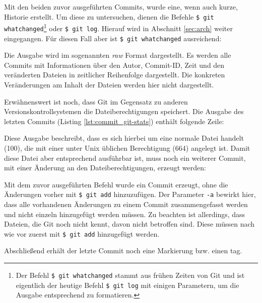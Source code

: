 
Mit den beiden zuvor ausgeführten Commits, wurde eine, wenn auch
kurze, Historie erstellt. Um diese zu untersuchen, dienen die Befehle
\texttt{\$ git whatchanged}\footnote{Der Befehl \texttt{\$ git whatchanged}
stammt aus frühen Zeiten von Git und ist eigentlich der heutige Befehl
\texttt{\$ git log} mit einigen Parametern, um die Ausgabe entsprechend zu
formatieren.} oder \texttt{\$ git log}. Hierauf wird in Abschnitt \ref{sec:arch}
weiter eingegangen. Für diesen Fall aber ist \texttt{\$ git whatchanged}
ausreichend:


Die Ausgabe wird im sogenannten \textit{raw} Format dargestellt. Es werden alle
Commits mit Informationen über den Autor, Commit-ID, Zeit und den veränderten
Dateien in zeitlicher Reihenfolge dargestellt. Die konkreten Veränderungen am
Inhalt der Dateien werden hier nicht dargestellt.

Erwähnenswert ist noch, dass Git im Gegensatz zu anderen
Versionskontrollsystemen die Dateiberechtigungen speichert. Die Ausgabe des
letzten Commits (Listing \ref{lst:commit_git-stats}) enthält folgende Zeile:


Diese Ausgabe beschreibt, dass es sich hierbei um eine normale Datei handelt (100),
die mit einer unter Unix üblichen Berechtigung (664) angelegt ist. Damit
diese Datei aber entsprechend ausführbar ist, muss noch ein weiterer
Commit, mit einer Änderung an den Dateiberechtigungen, erzeugt werden:


Mit dem zuvor ausgeführten Befehl wurde ein Commit erzeugt, ohne die
Änderungen vorher mit \texttt{\$ git add} hinzuzufügen. Der Parameter
\texttt{-a} bewirkt hier, dass alle vorhandenen Änderungen zu einem Commit
zusammengefasst werden und nicht einzeln hinzugefügt werden müssen. Zu beachten
ist allerdings, dass Dateien, die Git noch nicht kennt, davon nicht betroffen
sind. Diese müssen nach wie vor zuerst mit \texttt{\$ git add} hinzugefügt
werden.

Abschließend erhält der letzte Commit noch eine Markierung bzw. einen \gls{tag}.

